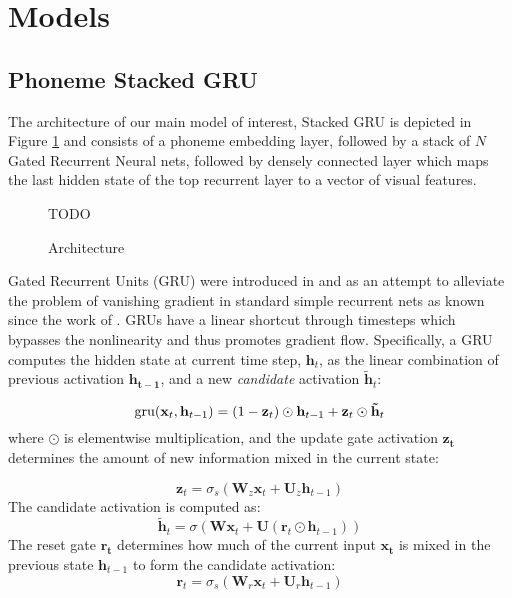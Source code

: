 \section{Models}
\label{sec:models}

\subsection{Phoneme Stacked GRU}
The architecture of our main model of interest, {\sc Stacked GRU} is
depicted in Figure \ref{fig:architecture} and consists of a phoneme
embedding layer, followed by a stack of $N$ Gated Recurrent Neural
nets, followed by densely connected layer which maps the last hidden
state of the top recurrent layer to a vector of visual features.

\begin{figure}
  \centering
  TODO
  \caption{Architecture}
  \label{fig:architecture}
\end{figure}

Gated Recurrent Units (GRU) were introduced in
 and  as an
attempt to alleviate the problem of vanishing gradient in standard
simple recurrent nets as known since the work of
. GRUs have a linear shortcut through
timesteps which bypasses the nonlinearity and thus promotes gradient
flow.
Specifically, a GRU computes the hidden state at current time step, $\mathbf{h}_{t}$, as the
linear combination of previous activation $\mathbf{h_{t-1}}$, and a new
{\it candidate} activation $\mathbf{\tilde{h}}_t$:
%

\begin{equation}
  \mathrm{gru}(\mathbf{x}_t, \mathbf{h}_{t-1}) = (1 - \mathbf{z}_t)\odot \mathbf{h}_{t-1} + \mathbf{z}_t \odot \mathbf{\tilde{h}}_t
\vspace{-.1cm}
\end{equation}
%
where $\odot$ is elementwise multiplication, and the update gate
activation $\mathbf{z_{t}}$ determines the amount of new information
mixed in the current state:
%

\begin{equation}
\label{eq:gru-update}
   \mathbf{z}_t = \sigma_s(\mathbf{W}_z \mathbf{x}_t + \mathbf{U}_z \mathbf{h}_{t-1})
\end{equation}
%
The candidate activation is computed as:
%
\begin{equation}
\label{eq:gru-cand}
   \mathbf{\tilde{h}}_t = \sigma(\mathbf{W} \mathbf{x}_t + \mathbf{U}(\mathbf{r}_t \odot \mathbf{h}_{t-1}))
\end{equation}
%
The reset gate $\mathbf{r_{t}}$ determines how much of the current
input $\mathbf{x_{t}}$ is mixed in the previous state
$\mathbf{h}_{t-1}$ to form the candidate activation:
%
\begin{equation}
\label{eq:gru-reset}
   \mathbf{r}_t = \sigma_s(\mathbf{W}_r \mathbf{x}_t + \mathbf{U}_r \mathbf{h}_{t-1})
\end{equation}

